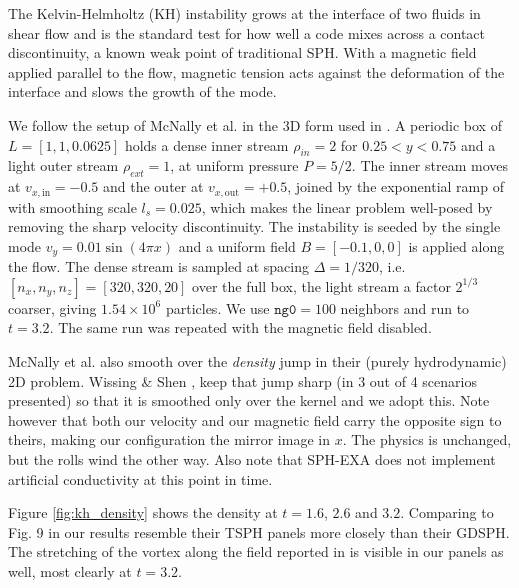 The Kelvin-Helmholtz (KH) instability grows at the interface of two fluids in shear flow and is the standard test for how well a code mixes across a contact discontinuity, a known weak point of traditional SPH. With a magnetic field applied parallel to the flow, magnetic tension acts against the deformation of the interface and slows the growth of the mode. %

We follow the setup of McNally et al. \cite{McNally2012} in the 3D form used in \cite{WissingShen2020}. A periodic box of $L= [1, 1, 0.0625]$ holds a dense inner stream $\rho_{in} = 2$ for $0.25 < y < 0.75$ and a light outer stream $\rho_{ext} = 1$, at uniform pressure $P = 5/2$. The inner stream moves at $v_{x,\mathrm{in}} = -0.5$ and the outer at $v_{x,\mathrm{out}} = +0.5$, joined by the exponential ramp of \cite{McNally2012} with smoothing scale $l_s = 0.025$, which makes the linear problem well-posed by removing the sharp velocity discontinuity. The instability is seeded by the single mode $v_y = 0.01 \sin(4 \pi x)$ and a uniform field $B = [-0.1, 0, 0]$ is applied along the flow. The dense stream is sampled at spacing $\Delta = 1/320$, i.e. $[n_x, n_y, n_z] = [320, 320, 20]$ over the full box, the light stream a factor $2^{1/3}$ coarser, giving $1.54 \times 10^6$ particles. We use $\texttt{ng0} = 100$ neighbors and run to $t = 3.2$. The same run was repeated with the magnetic field disabled.

McNally et al. also smooth over the \textit{density} jump in their (purely hydrodynamic) 2D problem. Wissing \& Shen \cite{WissingShen2020}, keep that jump sharp (in 3 out of 4 scenarios presented) so that it is smoothed only over the kernel and we adopt this. Note however that both our velocity and our magnetic field carry the opposite sign to theirs, making our configuration the mirror image in $x$. The physics is unchanged, but the rolls wind the other way. Also note that SPH-EXA does not implement artificial conductivity at this point in time.

Figure \ref{fig:kh_density} shows the density at $t = 1.6$, $2.6$ and $3.2$. Comparing to Fig. 9 in \cite{WissingShen2020} our results resemble their TSPH panels more closely than their GDSPH. The stretching of the vortex along the field reported in is visible in our panels as well, most clearly at $t=3.2$.

